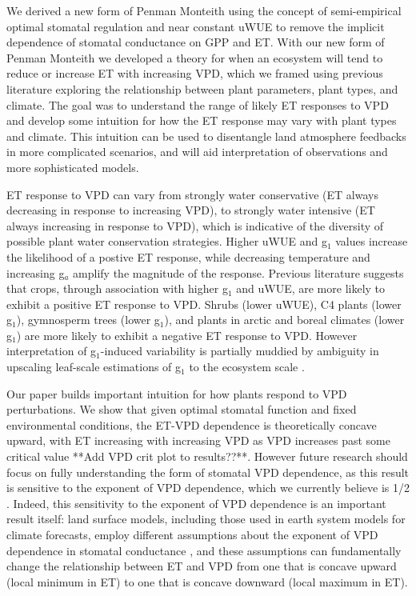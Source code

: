 We derived a new form of Penman Monteith using the concept of
semi-empirical optimal stomatal regulation \citep{Lin_2015,
MEDLYN_2011} and near constant uWUE \citep{Zhou_2015} to remove the
implicit dependence of stomatal conductance on GPP and ET. With our
new form of Penman Monteith we developed a theory for when an
ecosystem will tend to reduce or increase ET with increasing VPD,
which we framed using previous literature exploring the relationship
between plant parameters, plant types, and climate. The goal was to
understand the range of likely ET responses to VPD and develop some
intuition for how the ET response may vary with plant types and
climate. This intuition can be used to disentangle land atmosphere
feedbacks in more complicated scenarios, and will aid interpretation
of observations and more sophisticated models.

ET response to VPD can vary from strongly water conservative (ET
always decreasing in response to increasing VPD), to strongly water
intensive (ET always increasing in response to VPD), which is
indicative of the diversity of possible plant water conservation
strategies. Higher uWUE and g$_1$ values increase the likelihood of a
postive ET response, while decreasing temperature and increasing
g$_a$ amplify the magnitude of the response. Previous literature
\citep{Zhou_2015, Lin_2015} suggests that crops, through association
with higher g$_1$ and uWUE, are more likely to exhibit a positive ET
response to VPD. Shrubs (lower uWUE), C4 plants (lower g$_1$),
gymnosperm trees (lower g$_1$), and plants in arctic and boreal
climates (lower g$_1$) are more likely to exhibit a negative ET
response to VPD. However interpretation of g$_1$-induced variability
is partially muddied by ambiguity in upscaling leaf-scale estimations
of g$_1$ to the ecosystem scale \citep{Medlyn_2017}.

Our paper builds important intuition for how plants respond to VPD
perturbations. We show that given optimal stomatal function and fixed
environmental conditions, the ET-VPD dependence is theoretically
concave upward, with ET increasing with increasing VPD as VPD
increases past some critical value **Add VPD crit plot to
results??**. However future research should focus on fully
understanding the form of stomatal VPD dependence, as this result is
sensitive to the exponent of VPD dependence, which we currently
believe is 1/2 \citep{MEDLYN_2011, Zhou_2014}. Indeed, this
sensitivity to the exponent of VPD dependence is an important result
itself: land surface models, including those used in earth system
models for climate forecasts, employ different assumptions about the
exponent of VPD dependence in stomatal conductance
\citep[e.g.,][]{Ball_1987, Leuning_1990, MEDLYN_2011}, and these
assumptions can fundamentally change the relationship between ET and
VPD from one that is concave upward (local minimum in ET) to one that
is concave downward (local maximum in ET).

